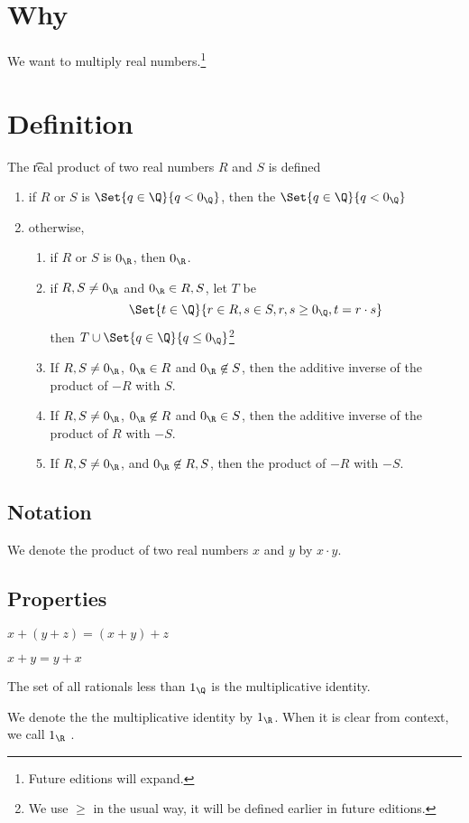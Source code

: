 

\section*{Why}

We want to multiply real numbers.\footnote{Future editions will expand.}

    \section*{Definition}


The \t{real product} of two real numbers $R$ and $S$ is defined
  \begin{enumerate}
    \item if $R$ or $S$ is $\Set{q \in \Q }{q < 0_{\Q }}$, then the $\Set{q \in \Q }{q < 0_{\Q }}$
    \item otherwise,
      \begin{enumerate}
        \item if $R$ or $S$ is $0_{\R }$, then $0_{\R }$.
        \item if $R,S \neq 0_{\R }$ and $0_{\R } \in R, S$, let $T$ be
          \[
\Set{t \in \Q }{r \in R, s \in S, r, s \geq 0_{\Q }, t = r\cdot  s}
          \]
then $T \cup \Set{q \in \Q }{q \leq 0_{\Q }}$\footnote{We use $\geq$ in the usual way, it will be defined earlier in future editions.}
        \item If $R, S \neq 0_{\R }$, $0_{\R } \in R$ and $0_{\R } \not\in S$, then the additive inverse of the product of $-R$ with $S$.
        \item If $R, S \neq 0_{\R }$, $0_{\R } \not\in R$ and $0_{\R } \in S$, then the additive inverse of the product of $R$ with $-S$.
        \item If $R, S \neq 0_{\R }$, and $0_{\R } \not\in R,S$, then the product of $-R$ with $-S$.
      \end{enumerate}
  \end{enumerate}

\subsection*{Notation}

We denote the product of two real numbers $x$ and $y$ by $x \cdot  y$.

\subsection*{Properties}

\begin{proposition}[Associative]
$x + (y + z) = (x + y) + z$\end{proposition}
\begin{proposition}[Commutative]
$x + y = y + x$\end{proposition}
\begin{proposition}[Identity]
The set of all rationals less than $1_{\Q }$ is the multiplicative identity.\end{proposition}
We denote the the multiplicative identity by $1_{\R }$.
When it is clear from context, we call $1_{\R }$ .
